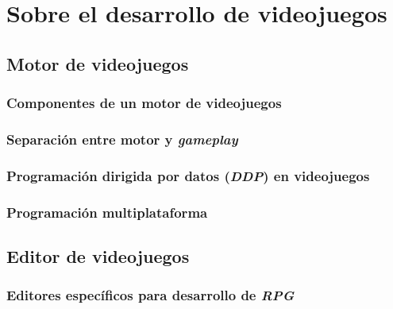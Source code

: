 \section{Sobre el desarrollo de videojuegos}

\subsection{Motor de videojuegos}

\subsubsection{Componentes de un motor de videojuegos}

\subsubsection{Separación entre motor y \textit{gameplay}}

\subsubsection{Programación dirigida por datos (\textit{DDP}) en videojuegos}

\subsubsection{Programación multiplataforma}

\subsection{Editor de videojuegos}

\subsubsection{Editores específicos para desarrollo de \textit{RPG}}

